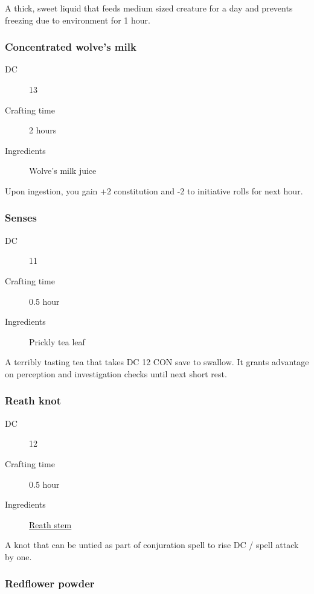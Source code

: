 A thick, sweet liquid that feeds medium sized creature for a day and prevents freezing 
due to environment for 1 hour.

\subsubsection{Concentrated wolve's milk}

\begin{description}
\item [DC] 13
\item [Crafting time] 2 hours
\item [Ingredients] Wolve's milk juice
\end{description}

Upon ingestion, you gain +2 constitution and -2 to initiative rolls for next hour.

\subsubsection{Senses}
\label{Senses}

\begin{description}
\item [DC] 11
\item [Crafting time] 0.5 hour
\item [Ingredients] Prickly tea leaf
\end{description}

A terribly tasting tea that takes DC 12 CON save to swallow. 
It grants advantage on perception and investigation checks until next short rest.

\subsubsection{Reath knot}
\label{Reath knot}

\begin{description}
\item [DC] 12
\item [Crafting time] 0.5 hour
\item [Ingredients] \hyperref[Reath]{Reath stem}
\end{description}

A knot that can be untied as part of conjuration spell to rise DC / spell attack by one.

\subsubsection{Redflower powder}
\label{Redflower powder}


